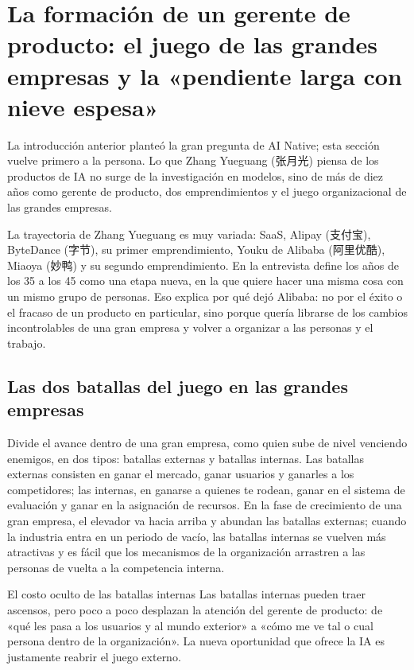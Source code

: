 \section{La formación de un gerente de producto: el juego de las grandes empresas y la «pendiente larga con nieve espesa»}

La introducción anterior planteó la gran pregunta de AI Native; esta sección vuelve primero a la persona. Lo que Zhang Yueguang (张月光) piensa de los productos de IA no surge de la investigación en modelos, sino de más de diez años como gerente de producto, dos emprendimientos y el juego organizacional de las grandes empresas.

La trayectoria de Zhang Yueguang es muy variada: SaaS, Alipay (支付宝), ByteDance (字节), su primer emprendimiento, Youku de Alibaba (阿里优酷), Miaoya (妙鸭) y su segundo emprendimiento. En la entrevista define los años de los 35 a los 45 como una etapa nueva, en la que quiere hacer una misma cosa con un mismo grupo de personas. Eso explica por qué dejó Alibaba: no por el éxito o el fracaso de un producto en particular, sino porque quería librarse de los cambios incontrolables de una gran empresa y volver a organizar a las personas y el trabajo.

\subsection{Las dos batallas del juego en las grandes empresas}

Divide el avance dentro de una gran empresa, como quien sube de nivel venciendo enemigos, en dos tipos: batallas externas y batallas internas. Las batallas externas consisten en ganar el mercado, ganar usuarios y ganarles a los competidores; las internas, en ganarse a quienes te rodean, ganar en el sistema de evaluación y ganar en la asignación de recursos. En la fase de crecimiento de una gran empresa, el elevador va hacia arriba y abundan las batallas externas; cuando la industria entra en un periodo de vacío, las batallas internas se vuelven más atractivas y es fácil que los mecanismos de la organización arrastren a las personas de vuelta a la competencia interna.

\begin{warningbox}{El costo oculto de las batallas internas}
Las batallas internas pueden traer ascensos, pero poco a poco desplazan la atención del gerente de producto: de «qué les pasa a los usuarios y al mundo exterior» a «cómo me ve tal o cual persona dentro de la organización». La nueva oportunidad que ofrece la IA es justamente reabrir el juego externo.
\end{warningbox}

